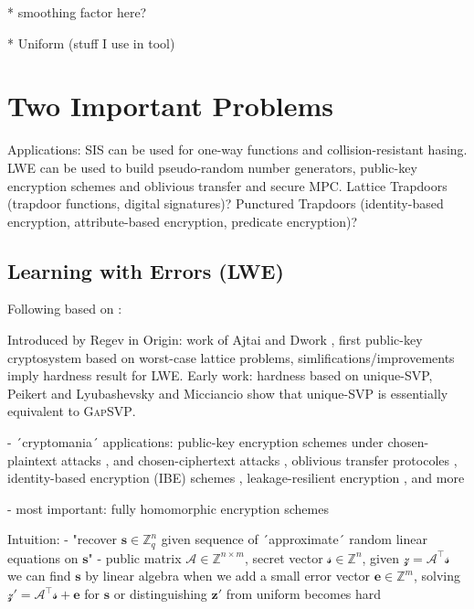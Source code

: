 \documentclass[
  a4paper,  %
  twoside,  %
  bibliography=totoc,
  headsepline,
  cleardoublepage=empty,
  parskip=half,
  draft=false
]{scrbook}
\begin{document}
    * smoothing factor here?

    * Uniform (stuff I use in tool)









\section{Two Important Problems}
Applications: SIS can be used for one-way functions and collision-resistant hasing. LWE can be used to build pseudo-random number generators, public-key encryption schemes and oblivious transfer and secure MPC. Lattice Trapdoors (trapdoor functions, digital signatures)? Punctured Trapdoors (identity-based encryption, attribute-based encryption, predicate encryption)? %

\subsection{Learning with Errors (LWE)} \label{sec:lwe}
Following based on \cite{Reg10}:%

Introduced by Regev in \cite{Reg09}
Origin: work of Ajtai and Dwork \cite{AD97}, first public-key cryptosystem based on worst-case lattice problems, simlifications/improvements \cite{GGH97b, Reg03} imply hardness result for LWE. 
Early work: hardness based on unique-SVP, Peikert \cite{Pei09} and Lyubashevsky and Micciancio \cite{LM09} show that unique-SVP is essentially equivalent to \textsc{GapSVP}.

- ´cryptomania´ applications: public-key encryption schemes under chosen-plaintext attacks \cite{Reg05, KTX07, PVW08}, and chosen-ciphertext attacks \cite{PW08, Pei09}, oblivious transfer protocoles \cite{PVW08}, identity-based encryption (IBE) schemes \cite{GPV08, CHKP10, ABB10}, leakage-resilient encryption \cite{AGV09, ACPS09, DGKPV10, GKPV10}, and more %

- most important: fully homomorphic encryption schemes \cite{Gen09a, BV11, Bra12, GSW13} %

Intuition: 
- "recover $\mathbf{s} \in \mathbb{Z}_q^n$ given sequence of ´approximate´ random linear equations on $\mathbf{s}$" 
- public matrix  $\mathcal{A} \in \mathbb{Z}^{n \times m}$, secret vector $\mathcal{s}\in \mathbb{Z}^n$, given $\mathcal{z} = \mathcal{A}^\intercal \mathcal{s}$ we can find $\mathbf{s}$ by linear algebra
when we add a small error vector $\mathbf{e} \in \mathbb{Z}^m$, solving $\mathcal{z}' = \mathcal{A}^\intercal \mathcal{s} + \mathbf{e}$ for $\mathbf{s}$ or distinguishing $\mathbf{z}'$ from uniform becomes hard
\end{document}
